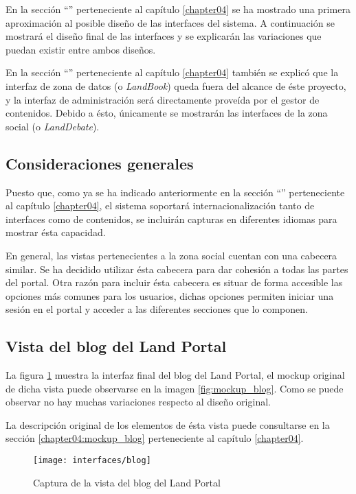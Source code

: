 En la sección ``'' perteneciente al capítulo \ref{chapter04} se ha mostrado una primera aproximación al posible diseño de las interfaces del sistema.  A continuación se mostrará el diseño final de las interfaces y se explicarán las variaciones que puedan existir entre ambos diseños.

En la sección ``'' perteneciente al capítulo \ref{chapter04} también se explicó que la interfaz de zona de datos (o \textit{LandBook}) queda fuera del alcance de éste proyecto, y la interfaz de administración será directamente proveída por el gestor de contenidos.  Debido a ésto, únicamente se mostrarán las interfaces de la zona social (o \textit{LandDebate}).

\subsection{Consideraciones generales}
Puesto que, como ya se ha indicado anteriormente en la sección ``'' perteneciente al capítulo \ref{chapter04}, el sistema soportará internacionalización tanto de interfaces como de contenidos, se incluirán capturas en diferentes idiomas para mostrar ésta capacidad.

En general, las vistas pertenecientes a la zona social cuentan con una cabecera similar.  Se ha decidido utilizar ésta cabecera para dar cohesión a todas las partes del portal.  Otra razón para incluir ésta cabecera es situar de forma accesible las opciones más comunes para los usuarios, dichas opciones permiten iniciar una sesión en el portal y acceder a las diferentes secciones que lo componen.


\subsection{Vista del blog del Land Portal}
La figura \ref{fig:interface_blog} muestra la interfaz final del blog del Land Portal, el mockup original de dicha vista puede observarse en la imagen \ref{fig:mockup_blog}.  Como se puede observar no hay muchas variaciones respecto al diseño original.  

La descripción original de los elementos de ésta vista puede consultarse en la sección \ref{chapter04:mockup_blog} perteneciente al capítulo \ref{chapter04}.

\begin{figure}[h]
	\centering
	\texttt{[image: interfaces/blog]}
	\caption{Captura de la vista del blog del Land Portal}
	\label{fig:interface_blog}
\end{figure}


